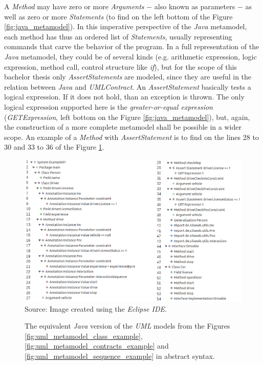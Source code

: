 \documentclass[tuberlin,cic,tc,english,noabntcite,oneside]{iiufrgs}
\begin{document}
A \emph{Method} may have zero or more \emph{Arguments} $-$ also known as parameters $-$ as well as zero or more \emph{Statements} (to find on the left bottom of the Figure \ref{fig:java_metamodel}). In this imperative perspective of the \emph{Java} metamodel, each method has thus an ordered list of \emph{Statements}, usually representing commands that carve the behavior of the program. In a full representation of the \emph{Java} metamodel, they could be of several kinds (e.g. arithmetic expression, logic expression, method call, control structure like \emph{if}), but for the scope of this bachelor thesis only \emph{AssertStatements} are modeled, since they are useful in the relation between \emph{Java} and \emph{UMLContract}. An \emph{AssertStatement} basically tests a logical expression. If it does not hold, than an exception is thrown. The only logical expression supported here is the \emph{greater-or-equal expression} (\emph{GETExpression}, left bottom on the Figure \ref{fig:java_metamodel}), but, again, the construction of a more complete metamodel shall be possible in a wider scope. An example of a \emph{Method} with \emph{AssertStatement} is to find on the lines 28 to 30 and 33 to 36 of the Figure \ref{fig:java_metamodel_example}.

\begin{figure}[H]
	\centering
    \caption{The equivalent \emph{Java} version of the \emph{UML} models from the Figures \ref{fig:uml_metamodel_class_example},  \ref{fig:uml_metamodel_contracts_example} and \ref{fig:uml_metamodel_sequence_example} in abstract syntax.}
    \includegraphics[width=\textwidth]{javaMetamodelExample01} \\
    Source: Image created using the \emph{Eclipse IDE}.
    \label{fig:java_metamodel_example}
\end{figure}
\end{document}
